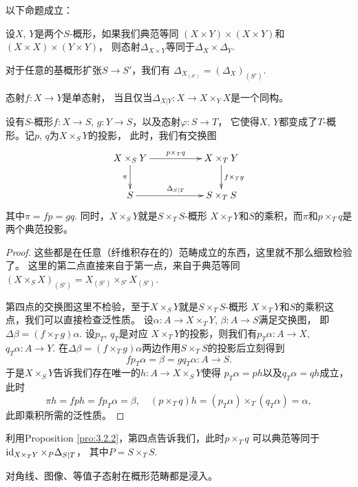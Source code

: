 \begin{pro}\label{pro:4.1.3}
以下命题成立：
\begin{compactenum}
\item 设$X$, $Y$是两个$S$-概形，如果我们典范等同
$(X\times Y)\times (X\times Y)$和$(X\times X)\times (Y\times Y)$，
则态射$\Delta_{X\times Y}$等同于$\Delta_X\times \Delta_Y$.	
\item 对于任意的基概形扩张$S\to S'$，我们有
$\Delta_{X_{(S')}}=(\Delta_{X})_{(S')}$.
\item 态射$f:X\to Y$是单态射，
当且仅当$\Delta_{X|Y}:X\to X\times_Y X$是一个同构。
\item 设有$S$-概形$f:X\to S$, $g:Y\to S$，以及态射$\varphi:S\to T$，
它使得$X$, $Y$都变成了$T$-概形。记$p$, $q$为$X\times_S Y$的投影，
此时，我们有交换图
\[
	\begin{xy}
	\xymatrix{
	X\times_S Y\ar[rr]^{p\times_T q}\ar[d]_{\pi}&&X\times_T Y\ar[d]^{f\times_T g}\\
	S\ar[rr]^{\Delta_{S|T}}&&S\times_TS
	}
	\end{xy}
\]
其中$\pi=fp=gq$. 同时，$X\times_S Y$就是$S\times_T S$-概形
$X\times_T Y$和$S$的乘积，而$\pi$和$p\times_T q$是两个典范投影。
\end{compactenum}	
\end{pro}

\begin{proof}
这些都是在任意（纤维积存在的）范畴成立的东西，这里就不那么细致检验了。
这里的第二点直接来自于第一点，来自于典范等同
$(X\times_S X)_{(S')}=X_{(S')}\times_{S'}X_{(S')}$.

第四点的交换图这里不检验，至于$X\times_S Y$就是$S\times_T S$-概形
$X\times_T Y$和$S$的乘积这点，我们可以直接检查泛性质。
设$\alpha:A\to X \times_T Y$, $\beta:A\to S$满足交换图，
即$\Delta\beta=(f\times_T g)\alpha$. 设$p_T$, $q_T$是对应
$X\times_T Y$的投影，则我们有$p_T\alpha:A\to X$, $q_T\alpha:A\to Y$. 
在$\Delta\beta=(f\times_T g)\alpha$两边作用$S\times_T S$的投影后立刻得到
\[
	fp_T\alpha=\beta=gq_T\alpha:A\to S.
\]
于是$X\times_S Y$告诉我们存在唯一的$h:A\to X\times_S Y$使得
$p_T\alpha=ph$以及$q_T\alpha=qh$成立，此时
\[
	\pi h=fph=fp_T\alpha=\beta, \quad 
	(p\times_T q)h=(p_T\alpha)\times_T (q_T\alpha)=\alpha,
\]
此即乘积所需的泛性质。
\end{proof}

利用Proposition \ref{pro:3.2.2}，第四点告诉我们，此时$p\times_T q$
可以典范等同于$\operatorname{id}_{X\times_T Y}\times_{P}\Delta_{S|T}$，
其中$P=S\times_T S$. 

\begin{lem}\label{lem:4.1.4}
	对角线、图像、等值子态射在概形范畴都是浸入。
\end{lem}

